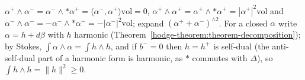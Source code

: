 \begin{solution}
$\alpha^+ \wedge \alpha^- = \alpha^- \wedge *\alpha^+ = \langle\alpha^-, \alpha^+\rangle\mathrm{vol} = 0$, $\alpha^+ \wedge \alpha^+ = \alpha^+ \wedge *\alpha^+ = |\alpha^+|^2\mathrm{vol}$ and
$\alpha^- \wedge \alpha^- = -\alpha^- \wedge *\alpha^- = -|\alpha^-|^2\mathrm{vol}$; expand $(\alpha^+ + \alpha^-)^{\wedge 2}$. For a closed $\alpha$ write $\alpha = h + d\beta$ with $h$ harmonic
(Theorem~\ref{hodge-theorem:theorem-decomposition}); by Stokes, $\int\alpha \wedge \alpha = \int h \wedge h$, and if $b^- = 0$ then $h = h^+$ is self-dual (the anti-self-dual part of a harmonic form is harmonic, as $*$
commutes with $\Delta$), so $\int h \wedge h = \|h\|^2 \geq 0$.
\end{solution}
